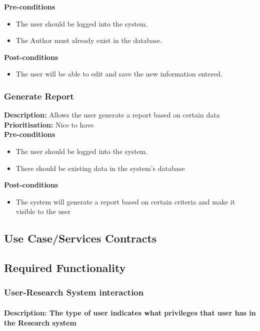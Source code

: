 \documentclass[a4paper]{article}
\begin{document}
	\textbf{Pre-conditions}
	 \begin{itemize}
		\item The user should be logged into the system.
		\item The Author must already exist in the database.
	\end{itemize}
	
	\textbf{Post-conditions}
	 \begin{itemize}
		\item The user will be able to edit and save the new information entered.
	\end{itemize}
    \pagebreak
    \subsubsection{Generate Report}
	\textbf{Description:} Allows the user generate a report based on certain data\\
	\textbf{Prioritisation:} Nice to have\\
	
	\textbf{Pre-conditions}
	 \begin{itemize}
		\item The user should be logged into the system.
		\item There should be existing data in the system's database
 	\end{itemize}
	
	\textbf{Post-conditions}
	 \begin{itemize}
		\item The system will generate a report based on certain criteria and make it visible to the user
	\end{itemize}
	
    \pagebreak
	\subsection{Use Case/Services Contracts}
	
	\subsection{Required Functionality}
	\subsubsection{User-Research System interaction}
	\paragraph{\textbf{Description:} The type of user indicates what privileges that user has in the Research system}
\end{document}
